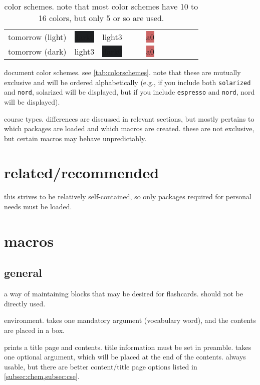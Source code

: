 \documentclass[lowerhead,12pt]{aesthetic}
\begin{document}
\begin{description}[font=\ttfamily]
\begin{landscape}
\begin{table}
\begin{tabular}{M{.1\linewidth}M{.1\linewidth}M{.05\linewidth}M{.1\linewidth}M{.1\linewidth}M{.1\linewidth}M{.1\linewidth}M{.1\linewidth}M{.1\linewidth}M{.1\linewidth}M{.05\linewidth}}
        to\-mor\-row (light) & {\color{white} \colorbox[HTML]{1d1f21}{dark0}} & \colorbox[HTML]{ffffff}{light3} & & & \colorbox[HTML]{cc6666}{a0} & & & & & \\
        to\-mor\-row (dark) & \colorbox[HTML]{ffffff}{light3} & {\color{white} \colorbox[HTML]{1d1f21}{dark0}} & & & \colorbox[HTML]{cc6666}{a0} & & & & & \\
        \bottomrule
      \end{tabular}
      \caption[color schemes]{color schemes. note that most color schemes have 10 to 16 colors, but only 5 or so are used.}
      \label{tab:colorschemes}
    \end{table}
  \end{landscape}
  document color schemes. see \vref{tab:colorschemes}. note that these are mutually exclusive and will be ordered alphabetically (e.g., if you include both \texttt{solarized} and \texttt{nord}, solarized will be displayed, but if you include \texttt{espresso} and \texttt{nord}, nord will be displayed).

  \item[anth, chem, cse, ling, math] course types. differences are discussed in relevant sections, but mostly pertains to which packages are loaded and which macros are created. these are not exclusive, but certain macros may behave unpredictably.
\end{description}

\section{related/recommended}
this strives to be relatively self-contained, so only packages required for personal needs must be loaded.

\section{macros}
\subsection{general}
\begin{description}[font=\ttfamily]
  \item[flashcard\footnotemark] a way of maintaining blocks that may be desired for flashcards. should not be directly used.

  \item[vocab] environment. takes one mandatory argument (vocabulary word), and the contents are placed in a box.

  \item[startgen] prints a title page and contents. title information must be set in preamble. takes one optional argument, which will be placed at the end of the contents. always usable, but there are better content/title page options listed in \vref{subsec:chem,subsec:cse}.
\end{description}
\end{document}
